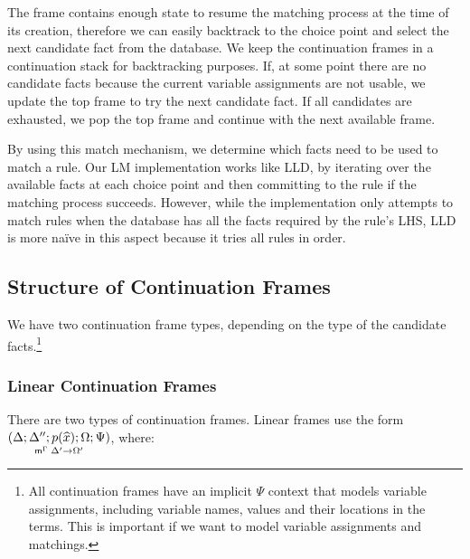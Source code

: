 The frame contains enough state to resume the matching process at the time of
its creation, therefore we can easily backtrack to the choice point and select
the next candidate fact from the database.  We keep the continuation frames in a
continuation stack for backtracking purposes. If, at some point there are no
candidate facts because the current variable assignments are not usable, we
update the top frame to try the next candidate fact. If all candidates are
exhausted, we pop the top frame and continue with the next available frame.

By using this match mechanism, we determine which facts need to be used to match
a rule.  Our LM implementation works like LLD, by iterating over the available
facts at each choice point and then committing to the rule if the matching
process succeeds. However, while the implementation only attempts to match rules
when the database has all the facts required by the rule's LHS, LLD is more
na\"{i}ve in this aspect because it tries all rules in order.


\subsection{Structure of Continuation Frames}

We have two continuation frame types, depending on the type of the candidate
facts.\footnote{All continuation frames have an implicit $\Psi$ context that
models variable assignments, including variable names, values and their
locations in the terms. This is important if we want to model variable
assignments and matchings.}

\subsubsection{Linear Continuation Frames}

There are two types of continuation frames. Linear frames use the form
$\lframe{\Delta}{\Delta''}{p(\widehat{x})}{\Omega; \Psi}{\Delta'}{\Omega'}$, where:

